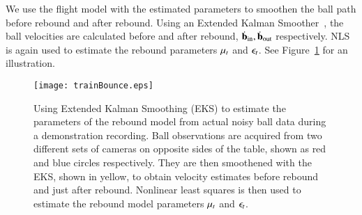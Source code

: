 We use the flight model with the estimated parameters to smoothen the ball path before rebound and after rebound. Using an Extended Kalman Smoother~\citep{Sorenson85}, the ball velocities are calculated before and after rebound, $\dot{\boldsymbol{\mathrm{b}}}_{\mathrm{in}}, \dot{\boldsymbol{\mathrm{b}}}_{\mathrm{out}}$ respectively. NLS is again used to estimate the rebound parameters $\mu_t$ and $\epsilon_t$. See Figure~\ref{trainBounce} for an illustration. %

\begin{figure}[t!]
	\centering
	\texttt{[image: trainBounce.eps]}			
	\caption{Using Extended Kalman Smoothing (EKS) to estimate the parameters of the rebound model from actual noisy ball data during a demonstration recording. Ball observations are acquired from two different sets of cameras on opposite sides of the table, shown as red and blue circles respectively. They are then smoothened with the EKS, shown in yellow, to obtain velocity estimates before rebound and just after rebound. Nonlinear least squares is then used to estimate the rebound model parameters $\mu_t$ and $\epsilon_t$.} 
	\label{trainBounce}
\end{figure}

